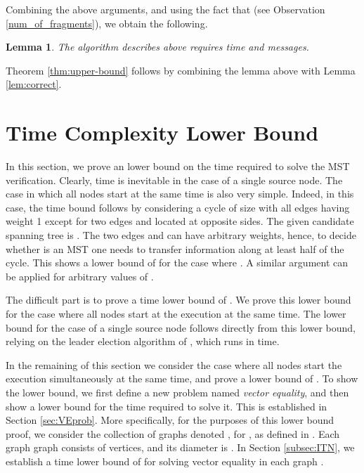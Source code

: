\documentclass[11pt,letter]{article}
\newtheorem{lemma}[theorem]{Lemma}
\begin{document}
\noindent
Combining 
the above arguments, and using the fact that  (see Observation \ref{num_of_fragments}), we obtain the following. 

\begin{lemma}
The  algorithm describes above requires   time
and  messages.
\end{lemma}

Theorem \ref{thm:upper-bound} follows by combining the
 lemma above   with Lemma \ref{lem:correct}.


\section{Time Complexity Lower Bound}
\label{sec:time-lb}

In this section, we prove an  lower bound 
on the time required to solve the MST verification. 
Clearly,  time is inevitable in the case of a single source node. 
The case in which all nodes start at the same time is also very simple.
Indeed, in this case, the  time bound follows by considering 
a cycle  of size  with all edges having weight 1 except for two edges 
 and  located at opposite sides. The given candidate spanning tree is 
. The two edges  and  can have arbitrary weights, 
hence, to decide whether  is an MST one needs to transfer information 
along at least half of the cycle.
This shows a lower bound of  for the case where . 
A similar argument can be applied for arbitrary values of .

The difficult part is to prove a time lower bound of .
We prove this lower bound for the case where all nodes start at the execution 
at the same time. The lower bound for the case of a single source node follows 
directly from this lower bound, relying on the leader election algorithm 
of \cite{KPPRT12}, which runs  in  time.

In the remaining of this section we consider the case where all nodes start the execution simultaneously at the same time, and prove a lower bound of .
To show the lower bound, 
we first define a new problem named {\em vector equality}, and then show 
a lower bound for the time required to solve it. 
This is established in Section \ref{sec:VEprob}.
More specifically, for the purposes of this lower bound proof, we consider the collection of graphs denoted , for
, as defined in \cite{PR_00}. Each graph graph  consists of
 vertices, and its diameter is . In Section \ref{subsec:ITN}, we establish a time lower bound 
of  for solving vector equality in each graph .
\end{document}
